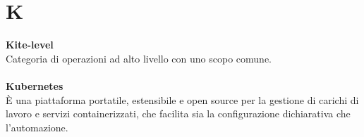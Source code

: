 \section{K}
\textbf{Kite-level}\\
Categoria di operazioni ad alto livello con uno scopo comune. \\ \\
\textbf{Kubernetes}\\
È una piattaforma portatile, estensibile e open source per la gestione di carichi di lavoro e servizi containerizzati, che facilita sia la configurazione dichiarativa che l'automazione. \\ \\
\clearpage